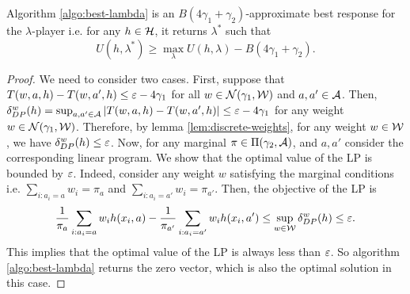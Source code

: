 \begin{lemma}
Algorithm \ref{algo:best-lambda} is an $B(4\gamma_1 + \gamma_2)$-approximate best response for the $\lambda$-player i.e. for any $h \in \mathcal{H}$, it returns $\lambda^*$ such that
$$U(h,\lambda^*) \ge \max_{\lambda} U(h,\lambda) - B(4\gamma_1 + \gamma_2).$$
\end{lemma}
\begin{proof}
We need to consider two cases. First, suppose that $T(w,a,h) - T(w,a',h) \le \varepsilon - 4\gamma_1$ for all $w \in \mathcal{N}(\gamma_1,\mathcal{W})$ and $a,a' \in \mathcal{A}$. Then, $\delta^w_{DP}(h) = \sup_{a,a'\in \mathcal{A}} \left|T(w,a,h) - T(w,a',h)\right| \le \varepsilon - 4\gamma_1$ for any weight $w \in \mathcal{N}(\gamma_1,\mathcal{W})$. Therefore, by lemma \ref{lem:discrete-weights}, for any weight $w \in \mathcal{W}$, we have $\delta^w_{DP}(h) \le \varepsilon$. 
Now, for any marginal $\pi \in \Pi(\gamma_2,\mathcal{A})$, and $a,a'$ consider the corresponding linear program. We show that the optimal value of the LP is bounded by $\varepsilon$. Indeed, consider any weight $w$ satisfying the marginal conditions i.e. $\sum_{i:a_i = a} w_i = \pi_a$ and $\sum_{i:a_i = a'} w_i = \pi_{a'}$. Then, the objective of the LP is 
$$\frac{1}{\pi_a} \sum_{i:a_i = a} w_i h(x_i,a) - \frac{1}{\pi_{a'}} \sum_{i:a_i = a'} w_i h(x_i,a') \le \sup_{w \in \mathcal{W}} \delta^w_{DP}(h) \le \varepsilon.$$
This implies that the optimal value of the LP is always less than $\varepsilon$. So algorithm \ref{algo:best-lambda} returns the zero vector, which is also the optimal solution in this case.


\end{proof}
